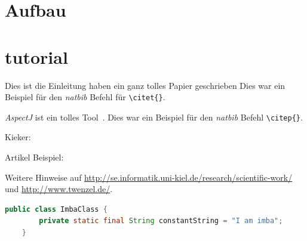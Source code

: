   \section{Aufbau}
    
    
  \section{tutorial}
    Dies ist die Einleitung
    \citet{Shaw2003} haben ein ganz tolles Papier geschrieben
    Dies war ein Beispiel für den \textit{natbib} Befehl für \texttt{\textbackslash{}citet\{\}}.

    \textit{AspectJ} ist ein tolles Tool~\citep{AspectJ}. Dies war ein Beispiel für den \textit{natbib} Befehl \texttt{\textbackslash{}citep\{\}}.

    Kieker: \citep{Rohr2008, Hoorn2009, Hoorn2012}

    Artikel Beispiel: \citep{Frey2011}

    Weitere Hinweise auf \url{http://se.informatik.uni-kiel.de/research/scientific-work/} und \url{http://www.twenzel.de/}.
    
    \begin{lstlisting}[language=Java, label=lst:imabclass, caption=ImbaClass in Java code]
	public class ImbaClass {
		private static final String constantString = "I am imba";
	}
    \end{lstlisting}
    

